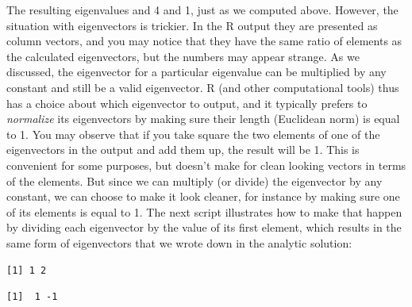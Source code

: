 \documentclass[
  letterpaper,
  DIV=11,
  numbers=noendperiod]{scrreprt}
\newenvironment{Shaded}{\begin{snugshade}}{\end{snugshade}}
\newcommand{\DecValTok}[1]{\textcolor[rgb]{0.68,0.00,0.00}{#1}}
\newcommand{\FunctionTok}[1]{\textcolor[rgb]{0.28,0.35,0.67}{#1}}
\newcommand{\NormalTok}[1]{\textcolor[rgb]{0.00,0.23,0.31}{#1}}
\newcommand{\OtherTok}[1]{\textcolor[rgb]{0.00,0.23,0.31}{#1}}
\newcommand{\SpecialCharTok}[1]{\textcolor[rgb]{0.37,0.37,0.37}{#1}}
\begin{document}
The resulting eigenvalues and 4 and 1, just as we computed above.
However, the situation with eigenvectors is trickier. In the R output
they are presented as column vectors, and you may notice that they have
the same ratio of elements as the calculated eigenvectors, but the
numbers may appear strange. As we discussed, the eigenvector for a
particular eigenvalue can be multiplied by any constant and still be a
valid eigenvector. R (and other computational tools) thus has a choice
about which eigenvector to output, and it typically prefers to
\emph{normalize} its eigenvectors by making sure their length (Euclidean
norm) is equal to 1. You may observe that if you take square the two
elements of one of the eigenvectors in the output and add them up, the
result will be 1. This is convenient for some purposes, but doesn't make
for clean looking vectors in terms of the elements. But since we can
multiply (or divide) the eigenvector by any constant, we can choose to
make it look cleaner, for instance by making sure one of its elements is
equal to 1. The next script illustrates how to make that happen by
dividing each eigenvector by the value of its first element, which
results in the same form of eigenvectors that we wrote down in the
analytic solution:

\begin{Shaded}
\end{Shaded}

\begin{verbatim}
[1] 1 2
\end{verbatim}

\begin{Shaded}
\end{Shaded}

\begin{verbatim}
[1]  1 -1
\end{verbatim}
\end{document}
